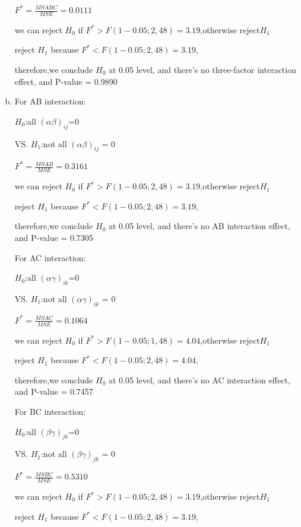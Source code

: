 \documentclass{article}\usepackage[]{graphicx}\usepackage[]{color}
\begin{document}
\begin{enumerate}[(a)]
\begin{center}
$F^*=\frac{MSABC}{MSE} = 0.0111$

we can reject $H_0$ if $F^* > F(1-0.05;2,48)=3.19$,otherwise reject$H_1$

reject $H_1$ because $F^*<F(1-0.05;2,48)=3.19$,

therefore,we conclude $H_0$ at 0.05 level, and there's no three-factor interaction effect, and P-value = 0.9890
\end{center}

\item

For AB interaction:

\begin{center}
$H_0$:all $(\alpha\beta)_{ij}$=0

VS. $H_1$:not all $(\alpha\beta)_{ij}$ = 0

$F^*=\frac{MSAB}{MSE} = 0.3161$

we can reject $H_0$ if $F^* > F(1-0.05;2,48)=3.19$,otherwise reject$H_1$

reject $H_1$ because $F^*<F(1-0.05;2,48)=3.19$,

therefore,we conclude $H_0$ at 0.05 level, and there's no AB interaction effect, and P-value = 0.7305
\end{center}

For AC interaction:

\begin{center}
$H_0$:all $(\alpha\gamma)_{ik}$=0

VS. $H_1$:not all $(\alpha\gamma)_{ik}$ = 0

$F^*=\frac{MSAC}{MSE} = 0.1064$

we can reject $H_0$ if $F^* > F(1-0.05;1,48)=4.04$,otherwise reject$H_1$

reject $H_1$ because $F^*<F(1-0.05;2,48)=4.04$,

therefore,we conclude $H_0$ at 0.05 level, and there's no AC interaction effect, and P-value = 0.7457
\end{center}

For BC interaction:

\begin{center}
$H_0$:all $(\beta\gamma)_{jk}$=0

VS. $H_1$:not all $(\beta\gamma)_{jk}$ = 0

$F^*=\frac{MSBC}{MSE} = 0.5310$

we can reject $H_0$ if $F^* > F(1-0.05;2,48)=3.19$,otherwise reject$H_1$

reject $H_1$ because $F^*<F(1-0.05;2,48)=3.19$,


\end{center}
\end{enumerate}
\end{document}
